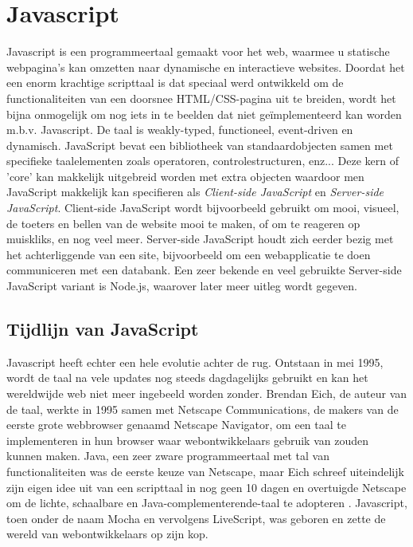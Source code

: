 \section{Javascript}
\label{sec:javascript}
Javascript is een programmeertaal gemaakt voor het web, waarmee u statische webpagina's kan omzetten naar dynamische en interactieve websites. Doordat het een enorm krachtige scripttaal is dat speciaal werd ontwikkeld om de functionaliteiten van een doorsnee HTML/CSS-pagina uit te breiden, wordt het bijna onmogelijk om nog iets in te beelden dat niet geïmplementeerd kan worden m.b.v. Javascript. De taal is weakly-typed, functioneel, event-driven en dynamisch. JavaScript bevat een bibliotheek van standaardobjecten samen met specifieke taalelementen zoals operatoren, controlestructuren, enz... Deze kern of 'core' kan makkelijk uitgebreid worden met extra objecten waardoor men JavaScript makkelijk kan specifieren als \textit{Client-side JavaScript} en \textit{Server-side JavaScript}. Client-side JavaScript wordt bijvoorbeeld gebruikt om mooi, visueel, de toeters en bellen van de website mooi te maken, of om te reageren op muiskliks, en nog veel meer. Server-side JavaScript houdt zich eerder bezig met het achterliggende van een site, bijvoorbeeld om een webapplicatie te doen communiceren met een databank. Een zeer bekende en veel gebruikte Server-side JavaScript variant is Node.js, waarover later meer uitleg wordt gegeven. \autocite{Javascript2019}

\subsection{Tijdlijn van JavaScript}
\label{sec:jsTimeline}

Javascript heeft echter een hele evolutie achter de rug. Ontstaan in mei 1995, wordt de taal na vele updates nog steeds dagdagelijks gebruikt en kan het wereldwijde web niet meer ingebeeld worden zonder. Brendan Eich, de auteur van de taal, werkte in 1995 samen met Netscape Communications, de makers van de eerste grote webbrowser genaamd Netscape Navigator, om een taal te implementeren in hun browser waar webontwikkelaars gebruik van zouden kunnen maken. Java, een zeer zware programmeertaal met tal van functionaliteiten was de eerste keuze van Netscape, maar Eich schreef uiteindelijk zijn eigen idee uit van een scripttaal in nog geen 10 dagen en overtuigde Netscape om de lichte, schaalbare en Java-complementerende-taal te adopteren \autocite{Rangpariya2019}. Javascript, toen onder de naam Mocha en vervolgens LiveScript, was geboren en zette de wereld van webontwikkelaars op zijn kop.

